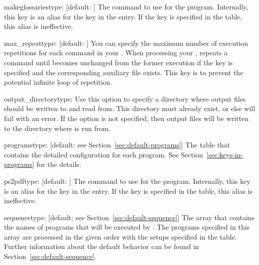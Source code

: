 \documentclass{llmk-doc}
\begin{document}
\begin{confkey}{makeglossaries}{type: }[default: ]
The command to use for the  program. Internally, this key
is an alias for the  key in the  entry. If
the  key is specified in the  table, this alias is
ineffective.
\end{confkey}

\begin{confkey}{max\_repeat}{type: }[default: ]
You can specify the maximum number of execution repetitions for each command in
your . When processing your ,  repeats
a command until  becomes unchanged from the former execution if
the key is specified and the corresponding auxiliary file exists. This key is to
prevent the potential infinite loop of repetition.
\end{confkey}

\begin{confkey}{output\_directory}{type: }
Use this option to specify a directory where  output files should be written to and read from. This directory must already exist, or else  will fail with an error. If the option is not specified, then output files will be written to the directory where  is run from.
\end{confkey}

\begin{confkey}{programs}{type: }
  [default: see Section~\ref{sec:default-programs}]
The table that contains the detailed configuration for each program. See
Section~\ref{sec:keys-in-programs} for the details.
\end{confkey}

\begin{confkey}{ps2pdf}{type: }[default: ]
The command to use for the  program. Internally, this key is
an alias for the  key in the  entry. If the
 key is specified in the  table, this alias is
ineffective.
\end{confkey}

\begin{confkey}{sequence}{type: }
  [default: see Section~\ref{sec:default-sequence}]
The array that contains the names of programs that will be executed by
. The programs specified in this array are processed in the given
order with the setups specified in the  table. Further
information about the default behavior can be found in
Section~\ref{sec:default-sequence}.
\end{confkey}
\end{document}
